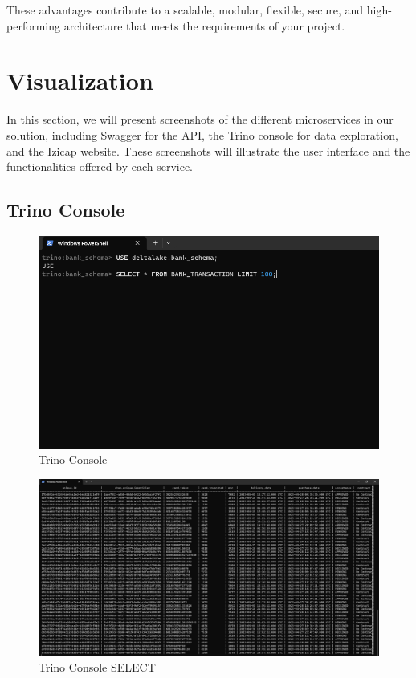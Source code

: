 These advantages contribute to a scalable, modular, flexible, secure, and high-performing architecture that meets the requirements of your project.

\section{Visualization}

In this section, we will present screenshots of the different microservices in our solution, including Swagger for the API, the Trino console for data exploration, and the Izicap website. These screenshots will illustrate the user interface and the functionalities offered by each service.

\subsection{Trino Console}

\begin{figure}[H]
\centering
\includegraphics[width=\linewidth]{images/trino-1.png}
\caption{Trino Console}\label{fig:trino-1}
\end{figure}

\begin{figure}[H]
\centering
\includegraphics[width=\linewidth]{images/trino-2.png}
\caption{Trino Console SELECT}\label{fig:trino-2}
\end{figure}

